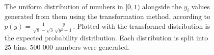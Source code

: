 \documentclass[11pt]{article}
\begin{document}
\begin{enumerate}
\begin{enumerate}
        \begin{figure}[H]%
            \centering
            \,
            \caption{The uniform distribution of numbers in $[0,1)$ alongside the $y_i$ values generated from them using the transformation method, according to $p(y)=\frac{1}{\sqrt 8 - \sqrt 3}\frac{y}{\sqrt{y^2-1}}$. Plotted with the transformed distribution is the expected probability distribution. Each distribution is split into 25 bins. 500 000 numbers were generated.}
            \label{fig:q2aii}
        \end{figure}


\end{enumerate}
\end{enumerate}
\end{document}

